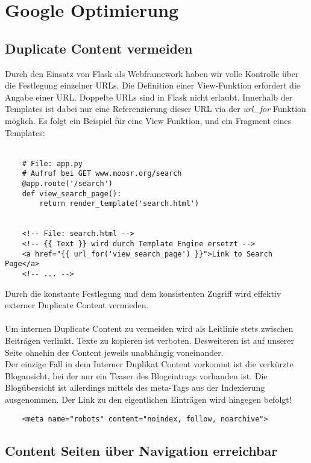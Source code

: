 \chapter{Google Optimierung}

\section{Duplicate Content vermeiden}
Durch den Einsatz von Flask als Webframework haben wir volle Kontrolle über
die Festlegung einzelner URLs. Die Definition einer View-Funktion erfordert die
Angabe einer URL. Doppelte URLs sind in Flask nicht erlaubt. Innerhalb der
Templates ist dabei nur eine Referenzierung dieser URL via der \emph{url\_for}
Funktion möglich. Es folgt ein Beispiel für eine View Funktion, und ein Fragment
eines Templates:
\\
\\
\begin{verbatim}
    # File: app.py
    # Aufruf bei GET www.moosr.org/search
    @app.route('/search')
    def view_search_page():
        return render_template('search.html')


    <!-- File: search.html -->
    <!-- {{ Text }} wird durch Template Engine ersetzt -->
    <a href="{{ url_for('view_search_page') }}">Link to Search Page</a>
    <!-- ... -->
\end{verbatim}

Durch die konstante Festlegung und dem konsistenten Zugriff wird effektiv
externer Duplicate Content vermieden. 
\\
\\
Um internen Duplicate Content zu vermeiden wird als Leitlinie stets zwischen
Beiträgen verlinkt. Texte zu kopieren ist verboten. Desweiteren ist auf unserer 
Seite ohnehin der Content jeweils unabhängig voneinander.
\\
Der einzige Fall in dem Interner Duplikat Content vorkommt ist die verkürzte
Blogansicht, bei der nur ein Teaser des Blogeintrags vorhanden ist. Die
Blogübersicht ist allerdings mittels des meta-Tags aus der Indexierung
ausgenommen. Der Link zu den eigentlichen Einträgen wird hingegen befolgt!

\begin{verbatim}
    <meta name="robots" content="noindex, follow, noarchive">
\end{verbatim}

\section{Content Seiten über Navigation erreichbar}

